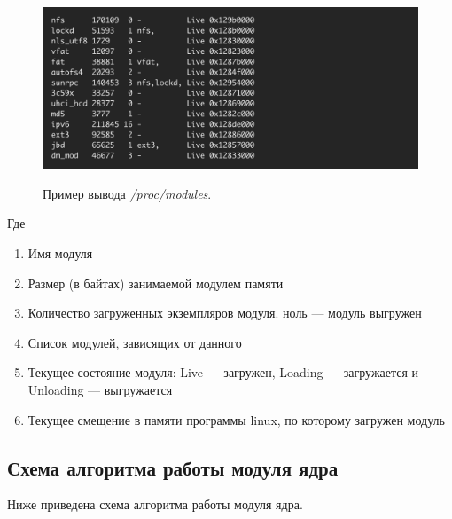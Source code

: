 \documentclass[a4paper,14pt]{extarticle}
\begin{document}
 	\begin{figure}[h!]
 		\begin{center}
 			{\includegraphics[scale = 0.6]{img/ris2.png}}
 			\label{ris:2}
 		\end{center}
 		\caption{Пример вывода \textit{/proc/modules}.}
 	\end{figure}
 
 	Где
 
 	\newpage
 
 	\begin{enumerate}
 		\item Имя модуля
 		\item Размер (в байтах) занимаемой модулем памяти
 		\item Количество загруженных экземпляров модуля. ноль — модуль выгружен
 		\item Список модулей, зависящих от данного
 		\item Текущее состояние модуля: Live — загружен, Loading — загружается и Unloading — выгружается
 		\item Текущее смещение в памяти программы linux, по которому загружен модуль
 	\end{enumerate}
 
 	\subsection{Схема алгоритма работы модуля ядра}
 	
 	Ниже приведена схема алгоритма работы модуля ядра.
 	
\end{document}

